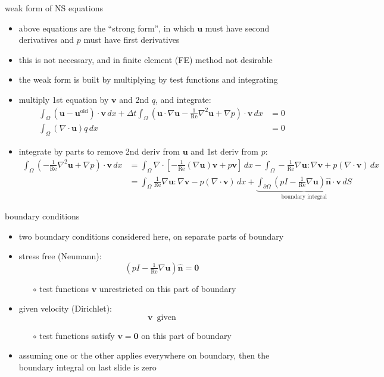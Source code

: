 \documentclass[10pt,hyperref,colorlinks]{beamer}
\newcommand{\bv}{\mathbf{v}}
\newcommand{\bu}{\mathbf{u}}
\newcommand{\bzero}{\bm{0}}
\newcommand{\hbn}{\hat{\mathbf{n}}}
\newcommand{\grad}{\nabla}
\newcommand{\Div}{\nabla\cdot}
\renewcommand{\Re}{\text{Re}}
\newcommand{\buold}{\bu^{\text{old}}}
\newcommand{\dx}{\,dx}
\newcommand{\dS}{\,dS}
\begin{document}
\begin{frame}{weak form of NS equations}

\begin{itemize}
\item above equations are the ``strong form'', in which $\bu$ must have second derivatives and $p$ must have first derivatives
\item this is not necessary, and in finite element (FE) method not desirable
\item the \alert{weak form} is built by multiplying by test functions and integrating
\item multiply 1st equation by $\bv$ and 2nd $q$, and integrate:
{\small
\begin{align*}
\int_\Omega (\bu - \buold)\cdot \bv \dx + \Delta t \int_\Omega \left(\bu \cdot \grad \bu - \frac{1}{\Re}\grad^2 \bu + \grad p\right) \cdot \bv \dx &= 0 \\
\int_\Omega (\Div \bu) q \dx &= 0
\end{align*}
}
\item integrate by parts to remove 2nd deriv from $\bu$ and 1st deriv from $p$:
{\scriptsize
\begin{align*}
\int_\Omega \left(- \tfrac{1}{\Re}\grad^2 \bu + \grad p\right) \cdot \bv \dx &= \int_\Omega \Div \left[- \tfrac{1}{\Re}(\grad \bu)\bv + p \bv\right] \dx - \int_\Omega - \tfrac{1}{\Re} \grad \bu : \grad\bv + p (\Div\bv) \dx \\
&= \int_\Omega \tfrac{1}{\Re} \grad \bu : \grad\bv - p (\Div\bv) \dx + \underbrace{\int_{\partial \Omega} \left(p I - \tfrac{1}{\Re}\grad \bu\right) \hbn \cdot \bv \dS}_{\text{boundary integral}}
\end{align*}
}
\end{itemize}
\end{frame}


\begin{frame}{boundary conditions}

\begin{itemize}
\item two boundary conditions considered here, on separate parts of boundary
\item \alert{stress free} (Neumann):
   $$\left(p I - \tfrac{1}{\Re}\grad \bu\right) \hbn=\bzero$$

    \begin{itemize}
    \item[$\circ$] test functions $\bv$ unrestricted on this part of boundary
    \end{itemize}
\item \alert{given velocity} (Dirichlet):
   $$\bv \, \text{ given}$$

    \begin{itemize}
    \item[$\circ$] test functions satisfy $\bv=\bzero$ on this part of boundary
    \end{itemize}

\medskip
\item assuming one or the other applies everywhere on boundary, then the boundary integral on last slide is zero
\end{itemize}
\end{frame}
\end{document}
